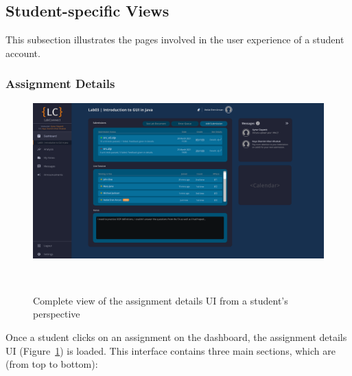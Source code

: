 \documentclass[a4paper, 12pt]{article}
\begin{document}
    \pagebreak


    \subsection{Student-specific Views}

    This subsection illustrates the pages involved in the user experience of a student account.

    \subsubsection{Assignment Details}

    \begin{figure}[H]
        \centering
        \includegraphics[width=\textwidth]{student_assignment_details}
        \caption{Complete view of the assignment details UI from a student's perspective}~\label{fig:student_assignment_details_full}
    \end{figure}

    Once a student clicks on an assignment on the dashboard, the assignment details UI (Figure~\ref{fig:student_assignment_details_full})
    is loaded. This interface contains three main sections, which are (from top to bottom):
\end{document}
